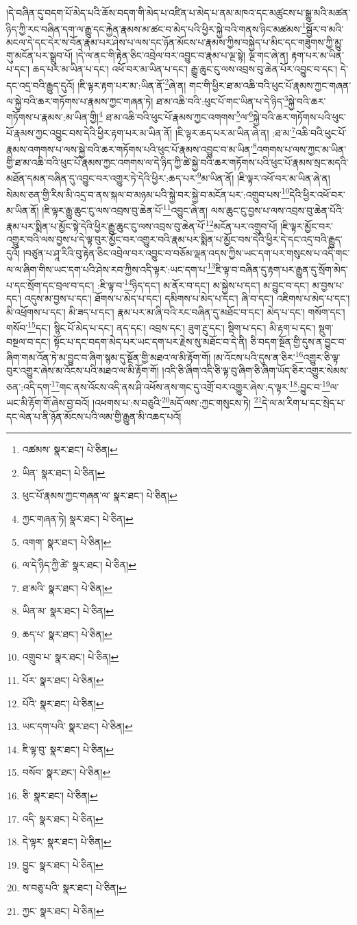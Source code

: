 །དེ་བཞིན་དུ་བདག་པོ་མེད་པའི་ཆོས་བདག་གི་མེད་པ་འཛིན་པ་མེད་པ་ནམ་མཁའ་དང་མཚུངས་པ་སྒྱུ་མའི་མཚན་ཉིད་ཀྱི་རང་བཞིན་དག་ལ་རྒྱུ་དང་རྐྱེན་རྣམས་མ་ཚང་བ་མེད་པའི་ཕྱིར་སྐྱེ་བའི་གནས་ཉིང་མཚམས་\footnote{འཚམས་  སྣར་ཐང་།  པེ་ཅིན། }སྦྱོར་བ་མའི་མངལ་དེ་དང་དེར་ས་བོན་རྣམ་པར་ཤེས་པ་ལས་དང་ཉོན་མོངས་པ་རྣམས་ཀྱིས་བསྐྱེད་པ་མིང་དང་གཟུགས་ཀྱི་མྱུ་གུ་མངོན་པར་སྒྲུབ་པོ། །དེ་ལ་ནང་གི་རྟེན་ཅིང་འབྲེལ་བར་འབྱུང་བ་རྣམ་པ་ལྔ་སྟེ། ལྔ་གང་ཞེ་ན། རྟག་པར་མ་ཡིན་པ་དང་། ཆད་པར་མ་ཡིན་པ་དང་། འཕོ་བར་མ་ཡིན་པ་དང་། རྒྱུ་ཆུང་ངུ་ལས་འབྲས་བུ་ཆེན་པོར་འབྱུང་བ་དང་། དེ་དང་འདྲ་བའི་རྒྱུད་དུའོ། །ཇི་ལྟར་རྟག་པར་མ་:ཡིན་ནོ་\footnote{ཡིན་  སྣར་ཐང་།  པེ་ཅིན། }ཞེ་ན། གང་གི་ཕྱིར་ཐ་མ་འཆི་བའི་ཕུང་པོ་རྣམས་ཀྱང་གཞན་ལ་སྐྱེ་བའི་ཆར་གཏོགས་པ་རྣམས་ཀྱང་གཞན་ཏེ། ཐ་མ་འཆི་བའི་:ཕུང་པོ་གང་ཡིན་པ་དེ་ཉིད་\footnote{ཕུང་པོ་རྣམས་ཀྱང་གཞན་ལ་  སྣར་ཐང་།  པེ་ཅིན། }སྐྱེ་བའི་ཆར་གཏོགས་པ་རྣམས་:མ་ཡིན་གྱི།\footnote{ཀྱང་གཞན་ཏེ།  སྣར་ཐང་།  པེ་ཅིན། } ཐ་མ་འཆི་བའི་ཕུང་པོ་རྣམས་ཀྱང་འགགས་\footnote{འགག་  སྣར་ཐང་།  པེ་ཅིན། }ལ་\footnote{ལ་དེ་ཉིད་ཀྱི་ཚེ་  སྣར་ཐང་།  པེ་ཅིན། }སྐྱེ་བའི་ཆར་གཏོགས་པའི་ཕུང་པོ་རྣམས་ཀྱང་འབྱུང་བས་དེའི་ཕྱིར་རྟག་པར་མ་ཡིན་ནོ། །ཇི་ལྟར་ཆད་པར་མ་ཡིན་ཞེ་ན། :ཐ་མ་\footnote{ཐ་མའི་  སྣར་ཐང་།  པེ་ཅིན། }འཆི་བའི་ཕུང་པོ་རྣམས་འགགས་པ་ལས་སྐྱེ་བའི་ཆར་གཏོགས་པའི་ཕུང་པོ་རྣམས་འབྱུང་བ་མ་ཡིན་\footnote{ཡིན་མ་  སྣར་ཐང་།  པེ་ཅིན། }འགགས་པ་ལས་ཀྱང་མ་ཡིན་གྱི་ཐ་མ་འཆི་བའི་ཕུང་པོ་རྣམས་ཀྱང་འགགས་ལ་དེ་ཉིད་ཀྱི་ཚེ་སྐྱེ་བའི་ཆར་གཏོགས་པའི་ཕུང་པོ་རྣམས་སྲང་མདའི་མཐོན་དམན་བཞིན་དུ་འབྱུང་བར་འགྱུར་ཏེ་དེའི་ཕྱིར་:ཆད་པར་\footnote{ཆད་པ་  སྣར་ཐང་།  པེ་ཅིན། }མ་ཡིན་ནོ། །ཇི་ལྟར་འཕོ་བར་མ་ཡིན་ཞེ་ན། སེམས་ཅན་གྱི་རིས་མི་འདྲ་བ་ནས་སྐལ་བ་མཉམ་པའི་སྐྱེ་བར་སྐྱེ་བ་མངོན་པར་:འགྲུབ་པས་\footnote{འགྲུབ་པ་  སྣར་ཐང་།  པེ་ཅིན། }དེའི་ཕྱིར་འཕོ་བར་མ་ཡིན་ནོ། །ཇི་ལྟར་རྒྱུ་ཆུང་ངུ་ལས་འབྲས་བུ་ཆེན་པོ་\footnote{པོར་  སྣར་ཐང་།  པེ་ཅིན། }འབྱུང་ཞེ་ན། ལས་ཆུང་ངུ་བྱས་པ་ལས་འབྲས་བུ་ཆེན་པོའི་རྣམ་པར་སྨིན་པ་མྱོང་སྟེ་དེའི་ཕྱིར་རྒྱུ་ཆུང་ངུ་ལས་འབྲས་བུ་ཆེན་པོ་\footnote{པོའི་  སྣར་ཐང་།  པེ་ཅིན། }མངོན་པར་འགྲུབ་པོ། །ཇི་ལྟར་མྱོང་བར་འགྱུར་བའི་ལས་བྱས་པ་དེ་ལྟ་བུར་མྱོང་བར་འགྱུར་བའི་རྣམ་པར་སྨིན་པ་མྱོང་བས་དེའི་ཕྱིར་དེ་དང་འདྲ་བའི་རྒྱུད་དུའོ། །བཙུན་པ་ཤཱ་རིའི་བུ་རྟེན་ཅིང་འབྲེལ་བར་འབྱུང་བ་བཅོམ་ལྡན་འདས་ཀྱིས་ཡང་དག་པར་གསུངས་པ་འདི་གང་ལ་ལ་ཞིག་གིས་ཡང་དག་པའི་ཤེས་རབ་ཀྱིས་འདི་ལྟར་:ཡང་དག་པ་\footnote{ཡང་དག་པའི་  སྣར་ཐང་།  པེ་ཅིན། }ཇི་ལྟ་བ་བཞིན་དུ་རྟག་པར་རྒྱུན་དུ་སྲོག་མེད་པ་དང་སྲོག་དང་བྲལ་བ་དང་། :ཇི་ལྟ་བ་\footnote{ཇི་ལྟ་བུ་  སྣར་ཐང་།  པེ་ཅིན། }ཉིད་དང་། མ་ནོར་བ་དང་། མ་སྐྱེས་པ་དང་། མ་བྱུང་བ་དང་། མ་བྱས་པ་དང་། འདུས་མ་བྱས་པ་དང་། ཐོགས་པ་མེད་པ་དང་། དམིགས་པ་མེད་པ་དང་། ཞི་བ་དང་། འཇིགས་པ་མེད་པ་དང་། མི་འཕྲོགས་པ་དང་། མི་ཟད་པ་དང་། རྣམ་པར་མ་ཞི་བའི་རང་བཞིན་དུ་མཐོང་བ་དང་། མེད་པ་དང་། གསོག་དང་། གསོབ་\footnote{བསོབ་  སྣར་ཐང་།  པེ་ཅིན། }དང་། སྙིང་པོ་མེད་པ་དང་། ནད་དང་། འབྲས་དང་། ཟུག་རྔུ་དང་། སྡིག་པ་དང་། མི་རྟག་པ་དང་། སྡུག་བསྔལ་བ་དང་། སྟོང་པ་དང་བདག་མེད་པར་ཡང་དག་པར་རྗེས་སུ་མཐོང་བ་དེ་ནི། ཅི་བདག་སྔོན་གྱི་དུས་ན་བྱུང་བ་ཞིག་གམ་འོན་ཏེ་མ་བྱུང་བ་ཞིག་སྙམ་དུ་སྔོན་གྱི་མཐའ་ལ་མི་རྟོག་གོ། །མ་འོངས་པའི་དུས་ན་ཅིར་\footnote{ཅི་  སྣར་ཐང་།  པེ་ཅིན། }འགྱུར་ཅི་ལྟ་བུར་འགྱུར་ཞེས་མ་འོངས་པའི་མཐའ་ལ་མི་རྟོག་གོ། །འདི་ཅི་ཞིག་འདི་ཅི་ལྟ་བུ་ཞིག་ཅི་ཞིག་ཡོད་ཅིར་འགྱུར་སེམས་ཅན་:འདི་དག་\footnote{འདི་  སྣར་ཐང་།  པེ་ཅིན། }གང་ནས་འོངས་འདི་ནས་ཤི་འཕོས་ནས་གང་དུ་འགྲོ་བར་འགྱུར་ཞེས་:ད་ལྟར་\footnote{དེ་ལྟར་  སྣར་ཐང་།  པེ་ཅིན། }:བྱུང་བ་\footnote{བྱུང་  སྣར་ཐང་།  པེ་ཅིན། }ལ་ཡང་མི་རྟོག་གོ་ཞེས་བྱ་བའོ། །འཕགས་པ་:ས་བཅུའི་\footnote{ས་བཅུ་པའི་  སྣར་ཐང་།  པེ་ཅིན། }མདོ་ལས་:ཀྱང་གསུངས་ཏེ། \footnote{ཀྱང་  སྣར་ཐང་།  པེ་ཅིན། }དེ་ལ་མ་རིག་པ་དང་སྲེད་པ་དང་ལེན་པ་ནི་ཉོན་མོངས་པའི་ལམ་གྱི་རྒྱུན་མི་འཆད་པའོ། 